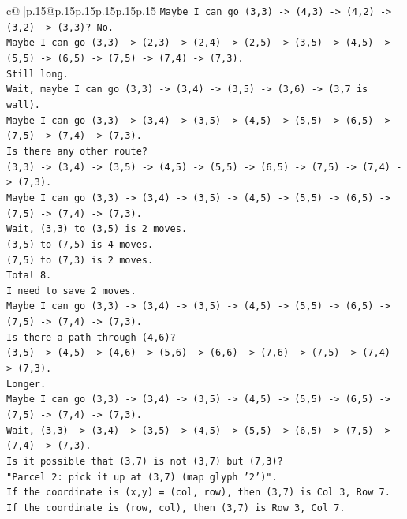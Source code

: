 \documentclass{article}
\begin{document}
{\begin{supertabular}{c@{$\;$}|p{.15\linewidth}@{}p{.15\linewidth}p{.15\linewidth}p{.15\linewidth}p{.15\linewidth}p{.15\linewidth}}
{{{\texttt{Maybe I can go (3,3) {-}> (4,3) {-}> (4,2) {-}> (3,2) {-}> (3,3)? No.} \\
\texttt{Maybe I can go (3,3) {-}> (2,3) {-}> (2,4) {-}> (2,5) {-}> (3,5) {-}> (4,5) {-}> (5,5) {-}> (6,5) {-}> (7,5) {-}> (7,4) {-}> (7,3).} \\
\texttt{Still long.} \\
\texttt{Wait, maybe I can go (3,3) {-}> (3,4) {-}> (3,5) {-}> (3,6) {-}> (3,7 is wall).} \\
\texttt{Maybe I can go (3,3) {-}> (3,4) {-}> (3,5) {-}> (4,5) {-}> (5,5) {-}> (6,5) {-}> (7,5) {-}> (7,4) {-}> (7,3).} \\
\texttt{Is there any other route?} \\
\texttt{(3,3) {-}> (3,4) {-}> (3,5) {-}> (4,5) {-}> (5,5) {-}> (6,5) {-}> (7,5) {-}> (7,4) {-}> (7,3).} \\
\texttt{Maybe I can go (3,3) {-}> (3,4) {-}> (3,5) {-}> (4,5) {-}> (5,5) {-}> (6,5) {-}> (7,5) {-}> (7,4) {-}> (7,3).} \\
\texttt{Wait, (3,3) to (3,5) is 2 moves.} \\
\texttt{(3,5) to (7,5) is 4 moves.} \\
\texttt{(7,5) to (7,3) is 2 moves.} \\
\texttt{Total 8.} \\
\texttt{I need to save 2 moves.} \\
\texttt{Maybe I can go (3,3) {-}> (3,4) {-}> (3,5) {-}> (4,5) {-}> (5,5) {-}> (6,5) {-}> (7,5) {-}> (7,4) {-}> (7,3).} \\
\texttt{Is there a path through (4,6)?} \\
\texttt{(3,5) {-}> (4,5) {-}> (4,6) {-}> (5,6) {-}> (6,6) {-}> (7,6) {-}> (7,5) {-}> (7,4) {-}> (7,3).} \\
\texttt{Longer.} \\
\texttt{Maybe I can go (3,3) {-}> (3,4) {-}> (3,5) {-}> (4,5) {-}> (5,5) {-}> (6,5) {-}> (7,5) {-}> (7,4) {-}> (7,3).} \\
\texttt{Wait, (3,3) {-}> (3,4) {-}> (3,5) {-}> (4,5) {-}> (5,5) {-}> (6,5) {-}> (7,5) {-}> (7,4) {-}> (7,3).} \\
\texttt{Is it possible that (3,7) is not (3,7) but (7,3)?} \\
\texttt{"Parcel 2: pick it up at (3,7) (map glyph '2')".} \\
\texttt{If the coordinate is (x,y) = (col, row), then (3,7) is Col 3, Row 7.} \\
\texttt{If the coordinate is (row, col), then (3,7) is Row 3, Col 7.} \\
}}}
\end{supertabular}}
\end{document}
